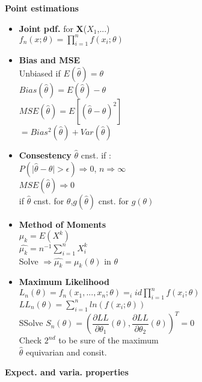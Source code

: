 \documentclass[a4paper, 10pt, landscape]{article}
\begin{document}
\begin{multicols*}{4}
\textbf{Point estimations}
\begin{itemize}
\item{\textbf{Joint pdf.} for \textbf{X}($X_1$,...)\\ \textbullet $f_n(x;\theta) = \displaystyle{\prod_{i=1}^n f(x_i; \theta)}$}
\item{\textbf{Bias and MSE} \\ \textbullet Unbiased if $E(\hat{\theta}) = \theta$ \\ \textbullet $Bias(\hat{\theta}) = E(\hat{\theta})-\theta$ \\ \textbullet $MSE(\hat{\theta})=E\left[ \left( \hat{\theta} - \theta \right) ^2 \right]$ \\ $=Bias^2(\hat{\theta}) + Var(\hat{\theta})$}
\item{\textbf{Consestency} $\hat{\theta}$ cnst. if : \\ \textbullet $P(\mid \hat{\theta} - \theta \mid > \epsilon) \Rightarrow 0$, $n\Rightarrow \infty$ \\ \textbullet $MSE(\hat{\theta}) \Rightarrow 0$ \\ \textbullet if $\hat{\theta}$ cnst. for $\theta$,$g(\hat{\theta})$ cnst. for $g(\theta)$}
\item{\textbf{Method of Moments} \\ \textbullet $\mu_k = E(X^k)$ \\ \textbullet $\hat{\mu_k}=n^{-1} \sum_{i=1}^n X_i^k$ \\ Solve $\Rightarrow \hat{\mu_k} = \mu_k(\theta)$ in $\theta$}
\item{\textbf{Maximum Likelihood} \\ \textbullet $L_n(\theta )=f_n(x_1,...,x_n;\theta ) =_iid \displaystyle{\prod_{i=1}^n f(x_i;\theta )}$ \\ \textbullet $LL_n(\theta ) = \displaystyle{\sum_{i=1}^n ln(f(x_i;\theta ))}$ \\ S\textbullet Solve $S_n(\theta) = \left( \dfrac{\partial LL}{\partial \theta_1} (\theta), \dfrac{\partial LL}{\partial \theta_2} (\theta) \right)^T =0$ \\ Check $2^{nd}$ to be sure of the maximum \\ \textbullet $\hat{\theta}$ equivarian and consit.}
\end{itemize}

\textbf{Expect. and varia. properties}


\end{multicols*}
\end{document}
